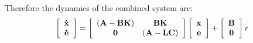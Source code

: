 Therefore the dynamics of the combined system are:
\[
\left[ {\begin{array}{*{20}c}
   {{\bf{\dot x}}}  \\
   {{\bf{\dot e}}}  \\
\end{array}} \right] = \left[ {\begin{array}{*{20}c}
   {\left( {{\bf{A}} - {\bf{BK}}} \right)} & {{\bf{BK}}}  \\
   {\bf{0}} & {\left( {{\bf{A}} - {\bf{LC}}} \right)}  \\
\end{array}} \right]\left[ {\begin{array}{*{20}c}
   {\bf{x}}  \\
   {\bf{e}}  \\
\end{array}} \right] + \left[ {\begin{array}{*{20}c}
   {\bf{B}}  \\
   {\bf{0}}  \\
	\end{array}} \right]r
\]

\endinput

